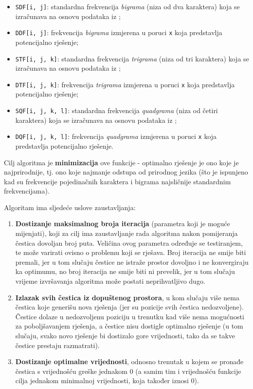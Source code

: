 \documentclass[12pt, a4paper]{article}
\begin{document}
\begin{itemize}
\renewcommand\labelitemi{--}

\item \texttt{SDF[i, j]}: standardna frekvencija \textit{bigrama} (niza od dva karaktera) koja se izračunava na osnovu podataka iz \cite{letters};
\item \texttt{DDF[i, j]}: frekvencija \textit{bigrama} izmjerena u poruci \texttt{x} koja predstavlja potencijalno rješenje;
\item \texttt{STF[i, j, k]}: standardna frekvencija \textit{trigrama} (niza od tri karaktera) koja se izračunava na osnovu podataka iz \cite{letters};
\item \texttt{DTF[i, j, k]}: frekvencija \textit{trigrama} izmjerena u poruci \texttt{x} koja predstavlja potencijalno rješenje;
\item \texttt{SQF[i, j, k, l]}: standardna frekvencija \textit{quadgrama} (niza od četiri karaktera) koja se izračunava na osnovu podataka iz \cite{letters};
\item \texttt{DQF[i, j, k, l]}: frekvencija \textit{quadgrama} izmjerena u poruci \texttt{x} koja predstavlja potencijalno rješenje.

\end{itemize}

Cilj algoritma je \textbf{minimizacija} ove funkcije - optimalno rješenje je ono koje je najprirodnije, tj. ono koje najmanje odstupa od prirodnog jezika (što je ispunjeno kad su frekvencije pojedinačnih karaktera i bigrama najsličnije standardnim frekvencijama).

Algoritam ima sljedeće uslove zaustavljanja:

\begin{enumerate}

\item \textbf{Dostizanje maksimalnog broja iteracija} (parametra koji je moguće mijenjati), koji za cilj ima zaustavljanje rada algoritma nakon pomijeranja čestica dovoljan broj puta. Veličina ovog parametra određuje se testiranjem, te može varirati ovisno o problemu koji se rješava. Broj iteracija ne smije biti premali, jer u tom slučaju čestice ne istraže prostor dovoljno i ne konvergiraju ka optimumu, no broj iteracija ne smije biti ni prevelik, jer u tom slučaju vrijeme izvršavanja algoritma može postati neprihvatljivo dugo.
\item \textbf{Izlazak svih čestica iz dopuštenog prostora}, u kom slučaju više nema čestica koje generišu nova rješenja (jer su pozicije svih čestica nedozvoljene). Čestice dolaze u nedozvoljenu poziciju u trenutku kad više nema mogućnosti za poboljšavanjem rješenja, a čestice nisu dostigle optimalno rješenje (u tom slučaju, svako novo rješenje bi dostizalo gore vrijednosti, tako da se takve čestice prestaju razmatrati).
\item \textbf{Dostizanje optimalne vrijednosti}, odnosno trenutak u kojem se pronađe čestica s vrijednošću greške jednakom 0 (a samim tim i vrijednošću funkcije cilja jednakom minimalnoj vrijednosti, koja također iznosi 0).

\end{enumerate}
\end{document}
